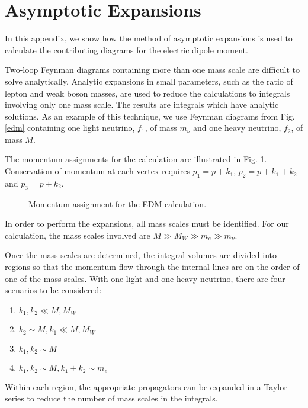\section{Asymptotic Expansions}
In this appendix, we show how the  method of asymptotic expansions
\cite{AE} is used to calculate the contributing diagrams for the
electric dipole moment.

Two-loop Feynman diagrams containing more than one mass scale are
difficult to solve analytically.  Analytic expansions in small
parameters, such as the ratio of lepton and weak boson masses, are
used to reduce the calculations to integrals involving only one
mass scale.  The results are integrals which have analytic
solutions.  As an example of this technique, we use Feynman
diagrams from Fig. \ref{edm} containing one light neutrino,
$f_{1}$, of mass $m_{\nu}$ and one heavy neutrino, $f_{2}$, of
mass $M$.

The momentum assignments for the calculation are illustrated in
Fig. \ref{fig:momentum}.  Conservation of momentum at each vertex
requires $p_{1}=p+k_{1}$, $p_{2}=p+k_{1}+k_{2}$ and
$p_{3}=p+k_{2}$.
%
%
\begin{figure}[htb]
\hspace*{25mm}
\begin{center}
\epsfxsize=45mm  \caption{Momentum assignment
for the EDM calculation.} \label{fig:momentum}
\end{center}\end{figure}
%
%

In order to perform the expansions, all mass scales must be
identified.  For our calculation, the mass scales involved are $M
\gg M_{W} \gg m_{e} \gg m_{\nu}$.

Once the mass scales are determined, the integral volumes are
divided into regions so that the momentum flow through the
internal lines are on the order of one of the mass scales.  With
one light and one heavy neutrino, there are four scenarios to be
considered:
%
%
\begin{enumerate}
\item $ k_{1},k_{2}  \ll  M, M_{W}$ \item $ k_{2}      \sim M,
k_{1} \ll M, M_{W} $ \item $ k_{1}, k_{2} \sim M $ \item $
k_{1},k_{2}  \sim M, k_{1}+k_{2} \sim m_{e}$
\end{enumerate}
%
%

Within each region, the appropriate propagators can be expanded in
a Taylor series to reduce the number of mass scales in the
integrals.

